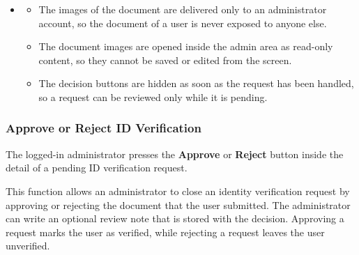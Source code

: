 \begin{itemize}[leftmargin=1.6em,topsep=4pt,itemsep=3pt,parsep=0pt,label=$\bullet$]
\begin{itemize}[leftmargin=2.2em,topsep=2pt,itemsep=3pt,parsep=0pt,label=$\circ$]
            \item \textbf{Document Not Available}: When an image of the document can no longer be read, the image is not shown and a message tells the user that the document is not available.
            \item \textbf{Lost Connection}: When the detail cannot be loaded, the screen asks the user to try again.
        \end{itemize}
    \item {}
        \begin{itemize}[leftmargin=2.2em,topsep=2pt,itemsep=3pt,parsep=0pt,label=$\circ$]
            \item The images of the document are delivered only to an administrator account, so the document of a user is never exposed to anyone else.
            \item The document images are opened inside the admin area as read-only content, so they cannot be saved or edited from the screen.
            \item The decision buttons are hidden as soon as the request has been handled, so a request can be reviewed only while it is pending.
        \end{itemize}
\end{itemize}


\subsubsection{Approve or Reject ID Verification}

 The logged-in administrator presses the \textbf{Approve} or \textbf{Reject} button inside the detail of a pending ID verification request.

 This function allows an administrator to close an identity verification request by approving or rejecting the document that the user submitted. The administrator can write an optional review note that is stored with the decision. Approving a request marks the user as verified, while rejecting a request leaves the user unverified.


